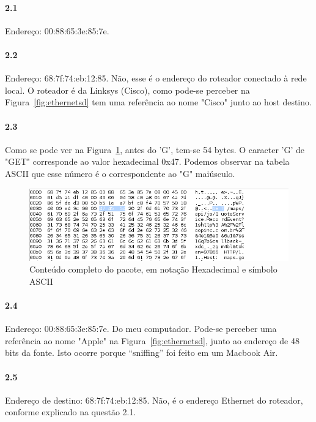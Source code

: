 \documentclass[12pt,a4paper]{report}
\begin{document}
\paragraph{2.1} Endereço: 00:88:65:3e:85:7e.

\paragraph{2.2} Endereço: 68:7f:74:eb:12:85. Não, esse é o endereço do roteador conectado à rede local. O roteador é da Linksys (Cisco), como pode-se perceber na Figura~\ref{fig:ethernetsd} tem uma referência ao nome "Cisco" junto ao host destino.

\paragraph{2.3} Como se pode ver na Figura~\ref{fig:get}, antes do 'G', tem-se 54 bytes. O caracter 'G' de "GET" corresponde ao valor hexadecimal 0x47. Podemos observar na tabela ASCII que esse número é o correspondente ao "G" maiúsculo.

\begin{figure}[h]
\centering
\includegraphics[width=\textwidth]{GET.png}
\caption{Conteúdo completo do pacote, em notação Hexadecimal e símbolo ASCII}
\label{fig:get}
\end{figure}

\paragraph{2.4} Endereço: 00:88:65:3e:85:7e. Do meu computador. Pode-se perceber uma referência ao nome "Apple" na Figura~\ref{fig:ethernetsd}, junto ao endereço de 48 bits da fonte. Isto ocorre porque ``sniffing'' foi feito em um Macbook Air.

\paragraph{2.5} Endereço de destino: 68:7f:74:eb:12:85. Não, é o endereço Ethernet do roteador, conforme explicado na questão 2.1.
\end{document}
